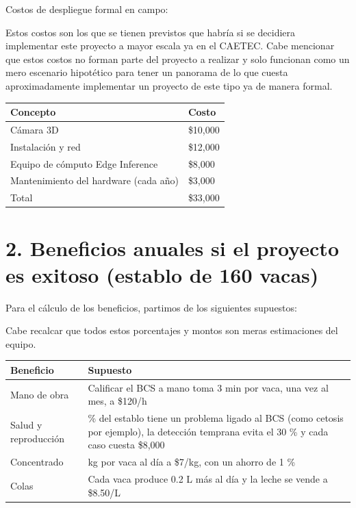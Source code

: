 \documentclass[11pt,letterpaper,DIV=12]{scrartcl}
\begin{document}
Costos de despliegue formal en campo:

Estos costos son los que se tienen previstos que habría si se decidiera implementar este proyecto a mayor escala ya en el CAETEC. Cabe mencionar que estos costos no forman parte del proyecto a realizar y solo funcionan como un mero escenario hipotético para tener un panorama de lo que cuesta aproximadamente implementar un proyecto de este tipo ya de manera formal.

\medskip

\noindent
\begin{tabularx}{\textwidth}{>{\raggedright\arraybackslash}X>{\raggedright\arraybackslash}X}
  \toprule
  Concepto & Costo \\
  \midrule
  Cámara 3D & \$10,000 \\
  Instalación y red & \$12,000 \\
  Equipo de cómputo Edge Inference & \$8,000 \\
  Mantenimiento del hardware (cada año) & \$3,000 \\
  \midrule
  Total & \$33,000 \\
  \bottomrule
\end{tabularx}

\section{2. Beneficios anuales si el proyecto es exitoso (establo de 160 vacas)}

Para el cálculo de los beneficios, partimos de los siguientes supuestos:

Cabe recalcar que todos estos porcentajes y montos son meras estimaciones del equipo.

\medskip

\noindent
\begin{tabularx}{\textwidth}{>{\raggedright\arraybackslash}X>{\raggedright\arraybackslash}X}
  \toprule
  Beneficio & Supuesto \\
  \midrule
  Mano de obra & Calificar el BCS a mano toma 3 min por vaca, una vez al mes, a \$120/h \\
  \addlinespace
  Salud y reproducción & 5 \% del establo tiene un problema ligado al BCS (como cetosis por ejemplo), la detección temprana evita el 30 \% y cada caso cuesta \$8,000 \\
  \addlinespace
  Concentrado & 8 kg por vaca al día a \$7/kg, con un ahorro de 1 \% \\
  \addlinespace
  Colas & Cada vaca produce 0.2 L más al día y la leche se vende a \$8.50/L \\
  \bottomrule
\end{tabularx}
\end{document}
